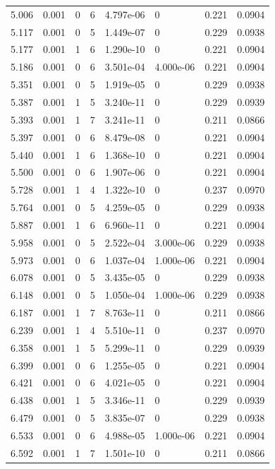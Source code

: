 \documentclass[preview]{standalone}
\begin{document}
{{{\begin{tabular}{L{1.2cm}C{1.2cm} C{0.3cm}C{0.5cm} C{1.4cm}C{1.4cm} C{1.4cm}C{1.4cm}}
  5.006  &  0.001  & 0     &  6 &  4.797e-06  & 0  & 0.221 &  0.0904   \\ 
  5.117  &  0.001  & 0     &  5 &  1.449e-07  & 0  & 0.229 &  0.0938   \\ 
  5.177  &  0.001  & 1     &  6 &  1.290e-10  & 0  & 0.221 &  0.0904   \\ 
  5.186  &  0.001  & 0     &  6 &  3.501e-04  & 4.000e-06  & 0.221 &  0.0904   \\ 
  5.351  &  0.001  & 0     &  5 &  1.919e-05  & 0  & 0.229 &  0.0938   \\ 
  5.387  &  0.001  & 1     &  5 &  3.240e-11  & 0  & 0.229 &  0.0939   \\ 
  5.393  &  0.001  & 1     &  7 &  3.241e-11  & 0  & 0.211 &  0.0866   \\ 
  5.397  &  0.001  & 0     &  6 &  8.479e-08  & 0  & 0.221 &  0.0904   \\ 
  5.440  &  0.001  & 1     &  6 &  1.368e-10  & 0  & 0.221 &  0.0904   \\ 
  5.500  &  0.001  & 0     &  6 &  1.907e-06  & 0  & 0.221 &  0.0904   \\ 
  5.728  &  0.001  & 1     &  4 &  1.322e-10  & 0  & 0.237 &  0.0970   \\ 
  5.764  &  0.001  & 0     &  5 &  4.259e-05  & 0  & 0.229 &  0.0938   \\ 
  5.887  &  0.001  & 1     &  6 &  6.960e-11  & 0  & 0.221 &  0.0904   \\ 
  5.958  &  0.001  & 0     &  5 &  2.522e-04  & 3.000e-06  & 0.229 &  0.0938   \\ 
  5.973  &  0.001  & 0     &  6 &  1.037e-04  & 1.000e-06  & 0.221 &  0.0904   \\ 
  6.078  &  0.001  & 0     &  5 &  3.435e-05  & 0  & 0.229 &  0.0938   \\ 
  6.148  &  0.001  & 0     &  5 &  1.050e-04  & 1.000e-06  & 0.229 &  0.0938   \\ 
  6.187  &  0.001  & 1     &  7 &  8.763e-11  & 0  & 0.211 &  0.0866   \\ 
  6.239  &  0.001  & 1     &  4 &  5.510e-11  & 0  & 0.237 &  0.0970   \\ 
  6.358  &  0.001  & 1     &  5 &  5.299e-11  & 0  & 0.229 &  0.0939   \\ 
  6.399  &  0.001  & 0     &  6 &  1.255e-05  & 0  & 0.221 &  0.0904   \\ 
  6.421  &  0.001  & 0     &  6 &  4.021e-05  & 0  & 0.221 &  0.0904   \\ 
  6.438  &  0.001  & 1     &  5 &  3.346e-11  & 0  & 0.229 &  0.0939   \\ 
  6.479  &  0.001  & 0     &  5 &  3.835e-07  & 0  & 0.229 &  0.0938   \\ 
  6.533  &  0.001  & 0     &  6 &  4.988e-05  & 1.000e-06  & 0.221 &  0.0904   \\ 
  6.592  &  0.001  & 1     &  7 &  1.501e-10  & 0  & 0.211 &  0.0866   \\ 
\hline 
\end{tabular} 

}}}
\end{document}
